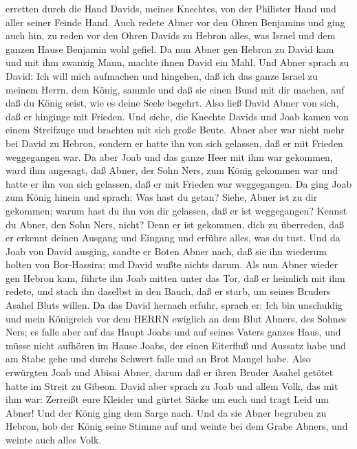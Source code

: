 erretten durch die Hand Davids, meines Knechtes, von der Philister Hand
und aller seiner Feinde Hand.  Auch redete Abner vor den
Ohren Benjamins und ging auch hin, zu reden vor den Ohren Davids zu
Hebron alles, was Israel und dem ganzen Hause Benjamin wohl gefiel.
 Da nun Abner gen Hebron zu David kam und mit ihm zwanzig
Mann, machte ihnen David ein Mahl.  Und Abner sprach zu
David: Ich will mich aufmachen und hingehen, daß ich das ganze Israel zu
meinem Herrn, dem König, sammle und daß sie einen Bund mit dir machen,
auf daß du König seist, wie es deine Seele begehrt. Also ließ David
Abner von sich, daß er hinginge mit Frieden.  Und siehe,
die Knechte Davids und Joab kamen von einem Streifzuge und brachten mit
sich große Beute. Abner aber war nicht mehr bei David zu Hebron, sondern
er hatte ihn von sich gelassen, daß er mit Frieden weggegangen war.
 Da aber Joab und das ganze Heer mit ihm war gekommen, ward
ihm angesagt, daß Abner, der Sohn Ners, zum König gekommen war und hatte
er ihn von sich gelassen, daß er mit Frieden war weggegangen.
 Da ging Joab zum König hinein und sprach: Was hast du
getan? Siehe, Abner ist zu dir gekommen; warum hast du ihn von dir
gelassen, daß er ist weggegangen?  Kennst du Abner, den
Sohn Ners, nicht? Denn er ist gekommen, dich zu überreden, daß er
erkennt deinen Ausgang und Eingang und erführe alles, was du tust.
 Und da Joab von David ausging, sandte er Boten Abner nach,
daß sie ihn wiederum holten von Bor-Hassira; und David wußte nichts
darum.  Als nun Abner wieder gen Hebron kam, führte ihn
Joab mitten unter das Tor, daß er heimlich mit ihm redete, und stach ihn
daselbst in den Bauch, daß er starb, um seines Bruders Asahel Bluts
willen.  Da das David hernach erfuhr, sprach er: Ich bin
unschuldig und mein Königreich vor dem HERRN ewiglich an dem Blut
Abners, des Sohnes Ners;  es falle aber auf das Haupt Joabs
und auf seines Vaters ganzes Haus, und müsse nicht aufhören im Hause
Joabs, der einen Eiterfluß und Aussatz habe und am Stabe gehe und durchs
Schwert falle und an Brot Mangel habe.  Also erwürgten Joab
und Abisai Abner, darum daß er ihren Bruder Asahel getötet hatte im
Streit zu Gibeon.  David aber sprach zu Joab und allem
Volk, das mit ihm war: Zerreißt eure Kleider und gürtet Säcke um euch
und tragt Leid um Abner! Und der König ging dem Sarge nach.
 Und da sie Abner begruben zu Hebron, hob der König seine
Stimme auf und weinte bei dem Grabe Abners, und weinte auch alles Volk.
